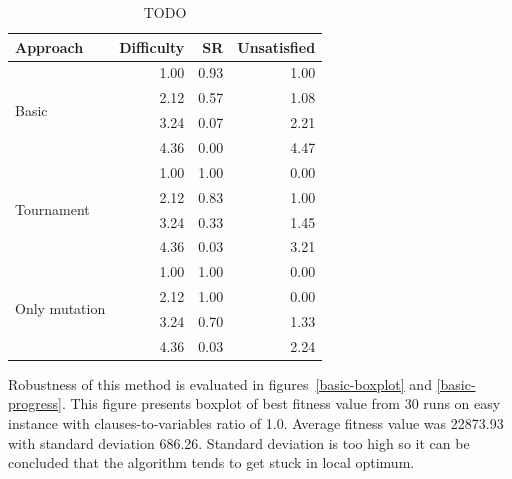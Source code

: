 \documentclass{article}
\begin{document}
\begin{table}[ht]
\caption{TODO}
\label{result-table}
\vskip 0.15in
\begin{center}
\begin{small}
\begin{sc}
\begin{tabular}{lrrr}
\toprule
Approach & Difficulty & SR & Unsatisfied \\
\midrule
\multirow{4}{*}{Basic} & 1.00 & 0.93 & 1.00 \\
                       & 2.12 & 0.57 & 1.08 \\
                       & 3.24 & 0.07 & 2.21 \\
                       & 4.36 & 0.00 & 4.47 \\
\midrule
\multirow{4}{*}{Tournament} & 1.00 & 1.00 & 0.00 \\
                            & 2.12 & 0.83 & 1.00 \\
                            & 3.24 & 0.33 & 1.45 \\
                            & 4.36 & 0.03 & 3.21 \\
\midrule
\multirow{4}{*}{Only mutation} & 1.00 & 1.00 & 0.00 \\
                               & 2.12 & 1.00 & 0.00 \\
                               & 3.24 & 0.70 & 1.33 \\
                               & 4.36 & 0.03 & 2.24 \\
\bottomrule
\end{tabular}
\end{sc}
\end{small}
\end{center}
\vskip -0.1in
\end{table}

Robustness of this method is evaluated in figures~\ref{basic-boxplot}
and \ref{basic-progress}.
This figure presents boxplot of best fitness value from 30 runs
on easy instance with clauses-to-variables ratio of 1.0.
Average fitness value was 22873.93 with standard deviation 686.26.
Standard deviation is too high so it can be concluded
that the algorithm tends to get stuck in local optimum.
\end{document}
